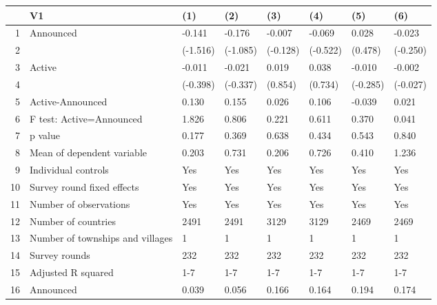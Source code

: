 \begin{table}[ht]
\centering
\begin{tabular}{rlllllll}
  \hline
 & V1 & (1) & (2) & (3) & (4) & (5) & (6) \\ 
  \hline
1 & Announced & -0.141 & -0.176 & -0.007 & -0.069 & 0.028 & -0.023 \\ 
  2 &  & (-1.516) & (-1.085) & (-0.128) & (-0.522) & (0.478) & (-0.250) \\ 
  3 & Active & -0.011 & -0.021 & 0.019 & 0.038 & -0.010 & -0.002 \\ 
  4 &  & (-0.398) & (-0.337) & (0.854) & (0.734) & (-0.285) & (-0.027) \\ 
  5 & Active-Announced & 0.130 & 0.155 & 0.026 & 0.106 & -0.039 & 0.021 \\ 
  6 & F test: Active=Announced & 1.826 & 0.806 & 0.221 & 0.611 & 0.370 & 0.041 \\ 
  7 & p value & 0.177 & 0.369 & 0.638 & 0.434 & 0.543 & 0.840 \\ 
  8 & Mean of dependent variable & 0.203 & 0.731 & 0.206 & 0.726 & 0.410 & 1.236 \\ 
  9 & Individual controls & Yes & Yes & Yes & Yes & Yes & Yes \\ 
  10 & Survey round fixed effects & Yes & Yes & Yes & Yes & Yes & Yes \\ 
  11 & Number of observations & Yes & Yes & Yes & Yes & Yes & Yes \\ 
  12 & Number of countries & 2491 & 2491 & 3129 & 3129 & 2469 & 2469 \\ 
  13 & Number of townships and villages & 1 & 1 & 1 & 1 & 1 & 1 \\ 
  14 & Survey rounds & 232 & 232 & 232 & 232 & 232 & 232 \\ 
  15 & Adjusted R squared & 1-7 & 1-7 & 1-7 & 1-7 & 1-7 & 1-7 \\ 
  16 & Announced & 0.039 & 0.056 & 0.166 & 0.164 & 0.194 & 0.174 \\ 
   \hline
\end{tabular}
\end{table}
